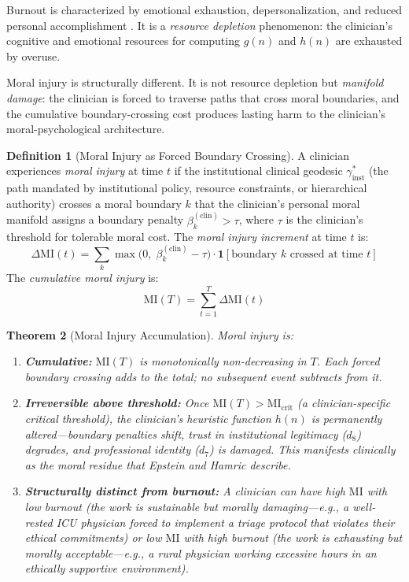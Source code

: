 \documentclass[12pt]{article}
\newtheorem{theorem}{Theorem}[section]
\theoremstyle{definition}
\newtheorem{definition}[theorem]{Definition}
\theoremstyle{remark}
\newcommand{\MI}{\mathrm{MI}}              %
\begin{document}
Burnout is characterized by emotional exhaustion, depersonalization, and reduced personal accomplishment \cite{maslach1981}.  It is a \emph{resource depletion} phenomenon: the clinician's cognitive and emotional resources for computing $g(n)$ and $h(n)$ are exhausted by overuse.

Moral injury is structurally different.  It is not resource depletion but \emph{manifold damage}: the clinician is forced to traverse paths that cross moral boundaries, and the cumulative boundary-crossing cost produces lasting harm to the clinician's moral-psychological architecture.

\begin{definition}[Moral Injury as Forced Boundary Crossing]
\label{def:moral_injury}
A clinician experiences \emph{moral injury} at time $t$ if the institutional clinical geodesic $\gamma_{\text{inst}}^*$ (the path mandated by institutional policy, resource constraints, or hierarchical authority) crosses a moral boundary $k$ that the clinician's personal moral manifold assigns a boundary penalty $\beta_k^{(\text{clin})} > \tau$, where $\tau$ is the clinician's threshold for tolerable moral cost.  The \emph{moral injury increment} at time $t$ is:
\begin{equation}
\Delta \MI(t) = \sum_k \max\bigl(0,\; \beta_k^{(\text{clin})} - \tau\bigr) \cdot \mathbf{1}[\text{boundary } k \text{ crossed at time } t]
\label{eq:moral_injury}
\end{equation}
The \emph{cumulative moral injury} is:
\begin{equation}
\MI(T) = \sum_{t=1}^{T} \Delta \MI(t)
\label{eq:cumulative_mi}
\end{equation}
\end{definition}

\begin{theorem}[Moral Injury Accumulation]
\label{thm:mi_accumulation}
Moral injury is:
\begin{enumerate}
    \item \textbf{Cumulative:} $\MI(T)$ is monotonically non-decreasing in $T$.  Each forced boundary crossing adds to the total; no subsequent event subtracts from it.
    \item \textbf{Irreversible above threshold:} Once $\MI(T) > \MI_{\text{crit}}$ (a clinician-specific critical threshold), the clinician's heuristic function $h(n)$ is permanently altered---boundary penalties shift, trust in institutional legitimacy ($d_8$) degrades, and professional identity ($d_7$) is damaged.  This manifests clinically as the moral residue that Epstein and Hamric \cite{epstein2009} describe.
    \item \textbf{Structurally distinct from burnout:} A clinician can have high $\MI$ with low burnout (the work is sustainable but morally damaging---e.g., a well-rested ICU physician forced to implement a triage protocol that violates their ethical commitments) or low $\MI$ with high burnout (the work is exhausting but morally acceptable---e.g., a rural physician working excessive hours in an ethically supportive environment).
\end{enumerate}
\end{theorem}
\end{document}
